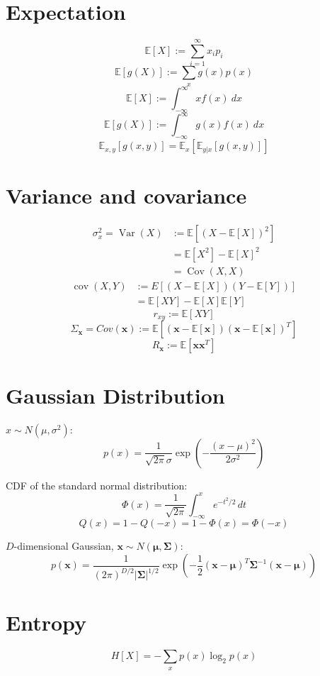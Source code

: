 \documentclass{report}
\begin{document}
\section*{Expectation}
\[\mathbb{E}[X] := \sum_{i=1}^\infty x_i p_i\]
\[\mathbb{E}[g(X)] := \sum_{x} g(x) p(x)\]
\[\mathbb{E}[X] := \int_{-\infty}^\infty x f(x)\ dx\]
\[\mathbb{E}[g(X)] := \int_{-\infty}^\infty g(x) f(x)\ dx\]
\[\mathbb{E}_{x, y}\left[g(x, y)\right] = \mathbb{E}_x\left[\mathbb{E}_{y|x}[g(x, y)]\right]\]

\section*{Variance and covariance}
\[\begin{split}
	\sigma_x^2 = \operatorname{Var}(X) &:= \mathbb{E}[(X - \mathbb{E}[X])^2] \\
	&= \mathbb{E}[X^2] - \mathbb{E}[X]^2 \\
	&= \operatorname{Cov}(X, X)
\end{split}\]
\[\begin{split}
	\operatorname{cov}(X, Y) &:= E{\left[(X - \mathbb{E}[X])(Y - \mathbb{E}[Y])\right]} \\
	&= \mathbb{E}[X Y] - \mathbb{E}[X] \mathbb{E}[Y]
\end{split}\]
\[r_{xy} := \mathbb{E}[X Y]\]
\[\Sigma_{\symbf{x}} = Cov(\symbf{x}) := \mathbb{E}\left[(\symbf{x} - \mathbb{E}[\symbf{x}])(\symbf{x} - \mathbb{E}[\symbf{x}])^T\right]\]
\[R_{\symbf{x}} := \mathbb{E}[\symbf{x} \symbf{x}^T]\]

\section*{Gaussian Distribution}
$x \sim N(\mu, \sigma^2)$:
\[p(x) = \frac{1}{\sqrt{2 \pi} \sigma} \exp\left(-\frac{(x-\mu)^2}{2\sigma^2}\right)\]

CDF of the standard normal distribution:
\[\Phi(x) = \frac{1}{\sqrt{2\pi}} \int_{-\infty}^x e^{-t^2/2} \, dt\]
\[Q(x) = 1 - Q(-x) = 1 - \Phi(x) = \Phi(-x)\]

$D$-dimensional Gaussian, $\symbf{x} \sim N(\symbf{\mu}, \symbf{\Sigma})$:
\[p(\symbf{x}) = \frac{1}{(2 \pi)^{D/2} |\symbf{\Sigma}|^{1/2}} \exp\left(-\frac{1}{2}(\symbf{x}-\symbf{\mu})^T \symbf{\Sigma}^{-1} (\symbf{x}-\symbf{\mu}) \right)\]

\section*{Entropy}
\[H[X] = - \sum_x p(x) \log_2 p(x)\]
\end{document}
